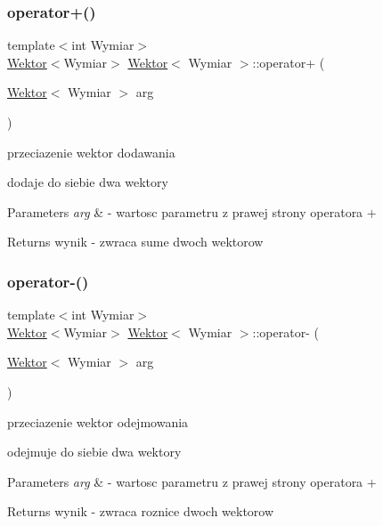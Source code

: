 \subsubsection{\texorpdfstring{operator+()}{operator+()}}
{\footnotesize\ttfamily template$<$int Wymiar$>$ \\
\hyperlink{classWektor}{Wektor}$<$Wymiar$>$ \hyperlink{classWektor}{Wektor}$<$ Wymiar $>$\+::operator+ (\begin{DoxyParamCaption}\item[{\hyperlink{classWektor}{Wektor}$<$ Wymiar $>$}]{arg }\end{DoxyParamCaption})\hspace{0.3cm}{\ttfamily [inline]}}



przeciazenie wektor dodawania 

dodaje do siebie dwa wektory 
\begin{DoxyParams}{Parameters}
{\em arg} & -\/ wartosc parametru z prawej strony operatora + \\
\hline
\end{DoxyParams}
\begin{DoxyReturn}{Returns}
wynik -\/ zwraca sume dwoch wektorow 
\end{DoxyReturn}
\mbox{\label{classWektor_a36c8df810f47db5b99a57654530c8171}} 
\subsubsection{\texorpdfstring{operator-\/()}{operator-()}}
{\footnotesize\ttfamily template$<$int Wymiar$>$ \\
\hyperlink{classWektor}{Wektor}$<$Wymiar$>$ \hyperlink{classWektor}{Wektor}$<$ Wymiar $>$\+::operator-\/ (\begin{DoxyParamCaption}\item[{\hyperlink{classWektor}{Wektor}$<$ Wymiar $>$}]{arg }\end{DoxyParamCaption})\hspace{0.3cm}{\ttfamily [inline]}}



przeciazenie wektor odejmowania 

odejmuje do siebie dwa wektory 
\begin{DoxyParams}{Parameters}
{\em arg} & -\/ wartosc parametru z prawej strony operatora + \\
\hline
\end{DoxyParams}
\begin{DoxyReturn}{Returns}
wynik -\/ zwraca roznice dwoch wektorow 
\end{DoxyReturn}
\mbox{\label{classWektor_a2dc8e9f75d86af3858121c5a99d0def5}} 
